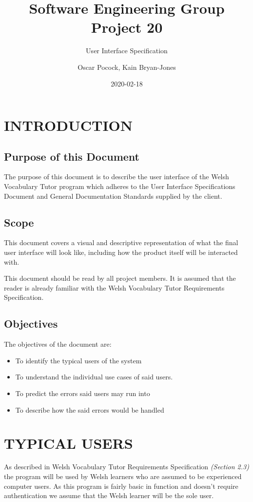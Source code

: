 \documentclass{project}
\begin{document}
\title{Software Engineering Group Project 20}
\subtitle{User Interface Specification}
\author{Oscar Pocock, Kain Bryan-Jones}     
\date{2020-02-18}
\maketitle
\tableofcontents
\newpage
\section{INTRODUCTION}
\subsection{Purpose of this Document}
The purpose of this document is to describe the user interface of the Welsh Vocabulary Tutor program which adheres to the User Interface Specifications Document\cite{se.qa.04} and General Documentation Standards\cite{se.qa.02} supplied by the client.

\subsection{Scope}
This document covers a visual and descriptive representation of what the final user interface will look like, including how the product itself will be interacted with.

This document should be read by all project members. It is assumed that the reader is already familiar with the Welsh Vocabulary Tutor Requirements Specification\cite{se.qa.csrs}.
\subsection{Objectives}
The objectives of the document are:
\begin{itemize}
	\item To identify the typical users of the system
	\item To understand the individual use cases of said users.
	\item To predict the errors said users may run into
	\item To describe how the said errors would be handled
\end{itemize}

\section{TYPICAL USERS}
As described in Welsh Vocabulary Tutor Requirements Specification \emph{(Section 2.3)}\cite{se.qa.02} the program will be used by Welsh learners who are assumed to be experienced computer users. As this program is fairly basic in function and doesn't require authentication we assume that the Welsh learner will be the sole user.
\end{document}
